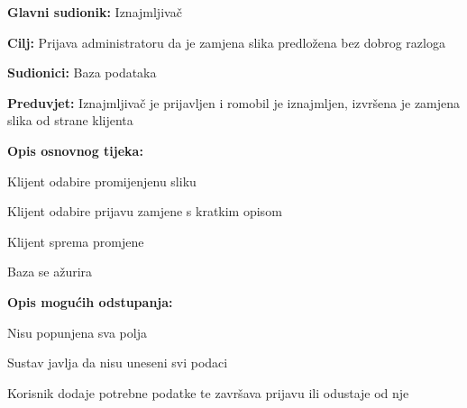 						\noindent {}
					\begin{packed_item}
	
						\item \textbf{Glavni sudionik: }Iznajmljivač
						\item  \textbf{Cilj: }Prijava administratoru da je zamjena slika predložena bez dobrog razloga
						\item  \textbf{Sudionici: }Baza podataka
						\item  \textbf{Preduvjet: }Iznajmljivač je prijavljen i romobil je iznajmljen, izvršena je zamjena slika od strane klijenta
						\item  \textbf{Opis osnovnog tijeka:}
						
						\item[] \begin{packed_enum}
	
							\item Klijent odabire promijenjenu sliku
							\item Klijent odabire prijavu zamjene s kratkim opisom
							\item Klijent sprema promjene
							\item Baza se ažurira


						\end{packed_enum}
						
						\item  \textbf{Opis mogućih odstupanja:}
						
						\item[] \begin{packed_item}
	
							\item[2.a] Nisu popunjena sva polja
							\item[] \begin{packed_enum}
								
								\item Sustav javlja da nisu uneseni svi podaci
								\item Korisnik dodaje potrebne podatke te završava prijavu ili odustaje od nje

							\end{packed_enum}
							
						\end{packed_item}						
					\end{packed_item}	






